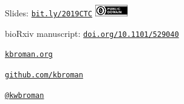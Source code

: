 \documentclass[aspectratio=169,12pt,t]{beamer}
\begin{document}
\begin{frame}[c]{}

\large

Slides: \href{https://bit.ly/2019CTC}{\tt bit.ly/2019CTC} \quad
\includegraphics[height=5mm]{Figs/cc-zero.png}

\vspace{8mm}

bioRxiv manuscript: \href{https://doi.org/10.1101/529040}{{\tt doi.org/10.1101/529040}}

\vspace{8mm}

\href{https://kbroman.org}{\tt kbroman.org}

\vspace{8mm}

\href{https://github.com/kbroman}{\tt github.com/kbroman}

\vspace{8mm}

\href{https://twitter.com/kwbroman}{\tt @kwbroman}


\end{frame}
\end{document}
